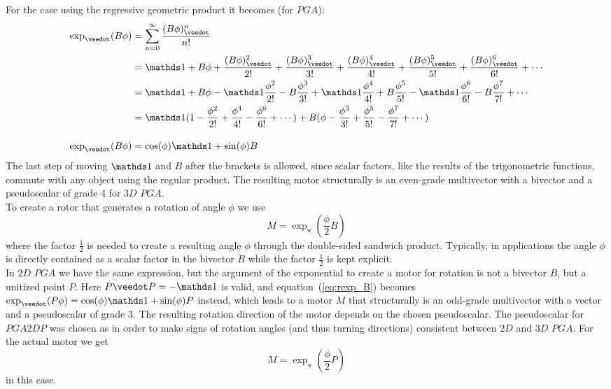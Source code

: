 For the case using the regressive geometric product it becomes (for $PGA$):
\begin{align}
\exp_\veedot(B\phi) &= \sum_{n=0}^{\infty} \frac{(B\phi)^n_\veedot}{n!} \nonumber \\ 
&= \ps + B\phi + \frac{(B\phi)^2_\veedot}{2!} + \frac{(B\phi)^3_\veedot}{3!} +
   \frac{(B\phi)^4_\veedot}{4!} + \frac{(B\phi)^5_\veedot}{5!} +
   \frac{(B\phi)^6_\veedot}{6!} + 
   \cdots \\
&= \ps + B\phi - \ps\frac{\phi^2}{2!} - B\frac{\phi^3}{3!} + \ps\frac{\phi^4}{4!} +
   B\frac{\phi^5}{5!} - \ps\frac{\phi^6}{6!} - B\frac{\phi^7}{7!} + \cdots
   \nonumber \\
&= \ps (1 - \frac{\phi^2}{2!} + \frac{\phi^4}{4!} - \frac{\phi^6}{6!} + \cdots) 
   + B (\phi - \frac{\phi^3}{3!} + \frac{\phi^5}{5!} - \frac{\phi^7}{7!} +
   \cdots)  \nonumber \\[10pt]
\exp_\veedot(B\phi) &= \cos(\phi)\ps + \sin(\phi) B
\label{eq:rexp_B}
\end{align}
The last step of moving $\ps$ and $B$ after the brackets is allowed, since scalar factors,
like the results of the trigonometric functions, commute with any object using the regular
product. The resulting motor structurally is an even-grade multivector with a bivector and
a pseudoscalar of grade 4 for $3D$ $PGA$. \\

To create a rotor that generates a rotation of angle $\phi$ we use
\begin{equation}
   M = \exp_\veedot{\left( \frac{\phi}{2} B  \right)}
\end{equation}
where the factor $\frac{1}{2}$ is needed to create a resulting angle $\phi$ through the
double-sided sandwich product. Typically, in applications the angle $\phi$ is directly
contained as a scalar factor in the bivector $B$ while the factor $\frac{1}{2}$ is kept
explicit. \\

In $2D$ $PGA$ we have the same expression, but the argument of the exponential to create a
motor for rotation is not a bivector $B$, but a unitized point $P$. Here $P \veedot P =
-\ps$ is valid, and equation~(\ref{eq:rexp_B}) becomes $\exp_\veedot(P\phi) =
\cos(\phi)\ps + \sin(\phi) P$ instead, which leads to a motor $M$ that structurally is an
odd-grade multivector with a vector and a pseudoscalar of grade 3. The resulting rotation
direction of the motor depends on the chosen pseudoscalar. The pseudoscalar for $PGA2DP$
was chosen as  in order to make signs of rotation angles (and thus turning
directions) consistent between $2D$ and $3D$ $PGA$. For the actual motor we get
\begin{equation}
      M = \exp_\veedot{\left( \frac{\phi}{2} P  \right)}
\end{equation}
in this case. \\

